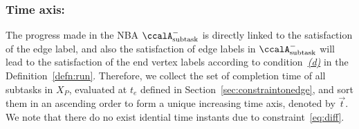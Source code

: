 \documentclass[Afour,sageh,times]{sagej}
\newcommand{\auto}[1]{\ccalA_{\textup{#1}}}
\newcommand{\autop}{\ccalA_{\phi}}
\begin{document}
{{{\subsubsection{Time axis:}\label{sec:timeaxis} The progress made in the NBA $\auto{subtask}^-$ is directly linked to the satisfaction of the edge label, and also the satisfaction of edge labels in $\auto{subtask}^-$ will lead to the satisfaction of the end vertex labels according to condition~\hyperref[cond:d]{\it (d)} in the Definition~\ref{defn:run}. Therefore, we collect the  set of completion time of all subtasks in $X_P$, evaluated at $t_e$ defined in Section~\ref{sec:constraintonedge}, and sort them in an ascending order to form a unique increasing time axis, denoted by $\vec{t}$. We note that there do no exist idential time instants due to constraint~\eqref{eq:diff}.


}}}
\end{document}
